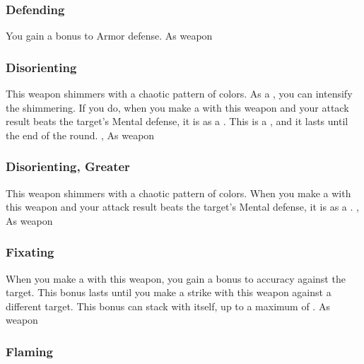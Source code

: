 \lowercase{\hypertarget{item:Defending}{}}\label{item:Defending}
\hypertarget{item:Defending}{\subsubsection{Defending\hfill{}}}
You gain a  bonus to Armor defense.
 
 As weapon
\lowercase{\hypertarget{item:Disorienting}{}}\label{item:Disorienting}
\hypertarget{item:Disorienting}{\subsubsection{Disorienting\hfill{}}}
This weapon shimmers with a chaotic pattern of colors.
As a , you can intensify the shimmering.
If you do, when you make a   with this weapon and your attack result beats the target's Mental defense, it is \disoriented as a .
This is a , and it lasts until the end of the round.
 , 
 As weapon
\lowercase{\hypertarget{item:Disorienting, Greater}{}}\label{item:Disorienting, Greater}
\hypertarget{item:Disorienting, Greater}{\subsubsection{Disorienting, Greater\hfill{}}}
This weapon shimmers with a chaotic pattern of colors.
When you make a  with this weapon and your attack result beats the target's Mental defense, it is \disoriented as a .
 , 
 As weapon
\lowercase{\hypertarget{item:Fixating}{}}\label{item:Fixating}
\hypertarget{item:Fixating}{\subsubsection{Fixating\hfill{}}}
When you make a  with this weapon, you gain a  bonus to accuracy against the target.
This bonus lasts until you make a strike with this weapon against a different target.
This bonus can stack with itself, up to a maximum of .
 
 As weapon
\lowercase{\hypertarget{item:Flaming}{}}\label{item:Flaming}
\hypertarget{item:Flaming}{\subsubsection{Flaming\hfill{}}}
